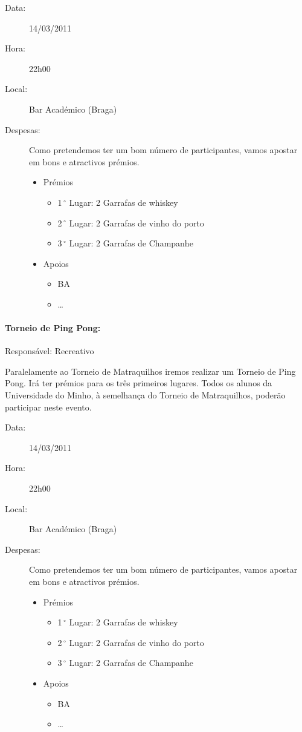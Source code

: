 \begin{description}
	\item[Data:] 14/03/2011
	\item[Hora:] 22h00
	\item[Local:] Bar Académico (Braga)
	\item[Despesas:] Como pretendemos ter um bom número de participantes, vamos apostar em bons e atractivos prémios.
	\begin{itemize}
		\item Prémios
		\begin{itemize}
			\item 1$\,^{\circ}$ Lugar: 2 Garrafas de whiskey
			\item 2$\,^{\circ}$ Lugar: 2 Garrafas de vinho do porto
			\item 3$\,^{\circ}$ Lugar: 2 Garrafas de Champanhe
		\end{itemize}
		\item Apoios
		\begin{itemize}
			\item BA
			\item \dots  
		\end{itemize}
	\end{itemize}
\end{description}

\paragraph{Torneio de Ping Pong:}
Responsável: Recreativo

Paralelamente ao Torneio de Matraquilhos iremos realizar um Torneio de Ping Pong. Irá ter prémios para os três primeiros lugares. Todos os alunos da Universidade do Minho, à semelhança do Torneio de Matraquilhos, poderão participar neste evento.

\begin{description}
	\item[Data:] 14/03/2011
	\item[Hora:] 22h00
	\item[Local:] Bar Académico (Braga)
	\item[Despesas:] Como pretendemos ter um bom número de participantes, vamos apostar em bons e atractivos prémios.
	\begin{itemize}
		\item Prémios
		\begin{itemize}
			\item 1$\,^{\circ}$ Lugar: 2 Garrafas de whiskey
			\item 2$\,^{\circ}$ Lugar: 2 Garrafas de vinho do porto
			\item 3$\,^{\circ}$ Lugar: 2 Garrafas de Champanhe
		\end{itemize}
		\item Apoios
		\begin{itemize}
			\item BA
			\item \dots  
		\end{itemize}
	\end{itemize}
\end{description}

